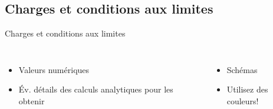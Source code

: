 \subsection{Charges et conditions aux limites}
\label{sec:Charges et Conditions aux limites}

\begin{frame}[c]{Charges et conditions aux limites}
  \begin{columns}
    \begin{itemize}
        \item Valeurs numériques
        \item Év. détails des calculs analytiques pour les obtenir
    \end{itemize}
    \begin{itemize}
        \item Schémas
        \item Utilisez des couleurs!
    \end{itemize}
  \end{columns}
\end{frame}

